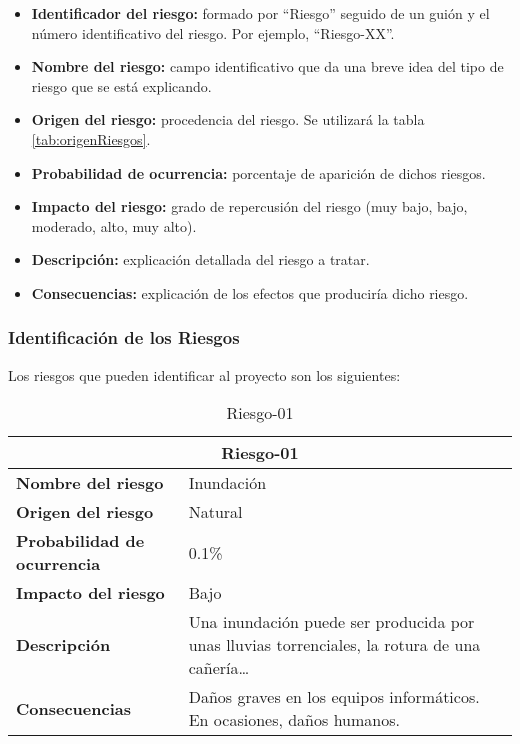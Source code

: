\begin{itemize}[-]
  \item \textbf{Identificador del riesgo:} formado por “Riesgo” seguido de un guión y el número identificativo del riesgo. Por ejemplo, “Riesgo-XX”.
  \item \textbf{Nombre del riesgo:} campo identificativo que da una breve idea del tipo de riesgo que se está explicando.
  \item \textbf{Origen del riesgo:} procedencia del riesgo. Se utilizará la tabla \ref{tab:origenRiesgos}.
  \item \textbf{Probabilidad de ocurrencia:} porcentaje de aparición de dichos riesgos.
  \item \textbf{Impacto del riesgo:} grado de repercusión del riesgo (muy bajo, bajo, moderado, alto, muy alto).
  \item \textbf{Descripción:} explicación detallada del riesgo a tratar.
  \item \textbf{Consecuencias:} explicación de los efectos que produciría dicho riesgo.
\end{itemize}

\subsubsection{Identificación de los Riesgos}
\par Los riesgos que pueden identificar al proyecto son los siguientes:

\begin{table}[H]
\begin{center}
\begin{tabular}{p{} p{7cm}}
\multicolumn{2}{c}{\textbf{Riesgo-01} } \\
\hline \hline
\textbf{Nombre del riesgo} & Inundación \\
\hline
\textbf{Origen del riesgo} & Natural \\
\hline
\textbf{Probabilidad de ocurrencia} & 0.1\%  \\
\hline
\textbf{Impacto del riesgo} &  Bajo \\
\hline
\textbf{Descripción} &  Una inundación puede ser producida por unas lluvias torrenciales, la rotura de una cañería… \\
\hline
\textbf{Consecuencias} &  Daños  graves  en los equipos informáticos. En ocasiones, daños humanos. \\
\hline
\end{tabular}
\caption{Riesgo-01}
\label{tab:Riesgo-01}
\end{center}
\end{table}

